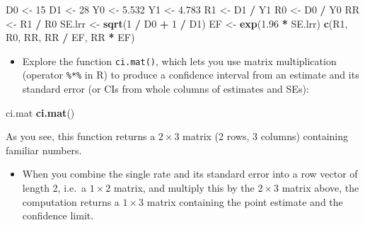 \documentclass[
]{book}
\newenvironment{Shaded}{\begin{snugshade}}{\end{snugshade}}
\newcommand{\DecValTok}[1]{\textcolor[rgb]{0.00,0.00,0.81}{#1}}
\newcommand{\FloatTok}[1]{\textcolor[rgb]{0.00,0.00,0.81}{#1}}
\newcommand{\FunctionTok}[1]{\textcolor[rgb]{0.13,0.29,0.53}{\textbf{#1}}}
\newcommand{\NormalTok}[1]{#1}
\newcommand{\OtherTok}[1]{\textcolor[rgb]{0.56,0.35,0.01}{#1}}
\newcommand{\SpecialCharTok}[1]{\textcolor[rgb]{0.81,0.36,0.00}{\textbf{#1}}}
\providecommand{\tightlist}{%
  \setlength{\itemsep}{0pt}\setlength{\parskip}{0pt}}
\begin{document}
\begin{Shaded}
\begin{Highlighting}[]
\NormalTok{D0 }\OtherTok{\textless{}{-}} \DecValTok{15}
\NormalTok{D1 }\OtherTok{\textless{}{-}} \DecValTok{28}
\NormalTok{Y0 }\OtherTok{\textless{}{-}} \FloatTok{5.532}
\NormalTok{Y1 }\OtherTok{\textless{}{-}} \FloatTok{4.783}
\NormalTok{R1 }\OtherTok{\textless{}{-}}\NormalTok{ D1 }\SpecialCharTok{/}\NormalTok{ Y1}
\NormalTok{R0 }\OtherTok{\textless{}{-}}\NormalTok{ D0 }\SpecialCharTok{/}\NormalTok{ Y0}
\NormalTok{RR }\OtherTok{\textless{}{-}}\NormalTok{ R1 }\SpecialCharTok{/}\NormalTok{ R0}
\NormalTok{SE.lrr }\OtherTok{\textless{}{-}} \FunctionTok{sqrt}\NormalTok{(}\DecValTok{1} \SpecialCharTok{/}\NormalTok{ D0 }\SpecialCharTok{+} \DecValTok{1} \SpecialCharTok{/}\NormalTok{ D1)}
\NormalTok{EF }\OtherTok{\textless{}{-}} \FunctionTok{exp}\NormalTok{(}\FloatTok{1.96} \SpecialCharTok{*}\NormalTok{ SE.lrr)}
\FunctionTok{c}\NormalTok{(R1, R0, RR, RR }\SpecialCharTok{/}\NormalTok{ EF, RR }\SpecialCharTok{*}\NormalTok{ EF)}
\end{Highlighting}
\end{Shaded}

\begin{itemize}
\tightlist
\item
  Explore the function \texttt{ci.mat()}, which lets you use
  matrix multiplication (operator \texttt{\textquotesingle{}\%*\%\textquotesingle{}}
  in R) to produce a confidence interval from an estimate and its
  standard error (or CIs from whole columns of estimates and SEs):
\end{itemize}

\begin{Shaded}
\begin{Highlighting}[]
\NormalTok{ci.mat}
\FunctionTok{ci.mat}\NormalTok{()}
\end{Highlighting}
\end{Shaded}

As you see, this function returns a \(2\times 3\) matrix (2 rows, 3 columns) containing familiar numbers.

\begin{itemize}
\tightlist
\item
  When you combine the single rate and its standard error into
  a row vector of length 2, i.e.~a \(1\times 2\) matrix, and multiply this
  by the \(2\times 3\) matrix above, the computation returns
  a \(1\times 3\) matrix containing the point estimate and the
  confidence limit.
\end{itemize}
\end{document}
